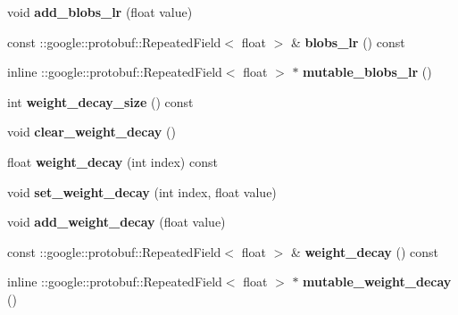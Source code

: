 \begin{DoxyCompactItemize}
void {\bfseries add\+\_\+blobs\+\_\+lr} (float value)
\item 
\mbox{\label{classcaffe_1_1_v0_layer_parameter_aad501869228a0d880f0899ce08270705}} 
const \+::google\+::protobuf\+::\+Repeated\+Field$<$ float $>$ \& {\bfseries blobs\+\_\+lr} () const
\item 
\mbox{\label{classcaffe_1_1_v0_layer_parameter_a98ee3955e1bbed8b7dfc98e8252832ce}} 
inline \+::google\+::protobuf\+::\+Repeated\+Field$<$ float $>$ $\ast$ {\bfseries mutable\+\_\+blobs\+\_\+lr} ()
\item 
\mbox{\label{classcaffe_1_1_v0_layer_parameter_a07bfc3bc513810fa6741308fa62bffad}} 
int {\bfseries weight\+\_\+decay\+\_\+size} () const
\item 
\mbox{\label{classcaffe_1_1_v0_layer_parameter_a2a57929236bf1d130a89d3bb711bea0d}} 
void {\bfseries clear\+\_\+weight\+\_\+decay} ()
\item 
\mbox{\label{classcaffe_1_1_v0_layer_parameter_ace05abd10a0c13883e8373a8e99a2202}} 
float {\bfseries weight\+\_\+decay} (int index) const
\item 
\mbox{\label{classcaffe_1_1_v0_layer_parameter_a85c6bbbb973441dc5f0d34c8c394651c}} 
void {\bfseries set\+\_\+weight\+\_\+decay} (int index, float value)
\item 
\mbox{\label{classcaffe_1_1_v0_layer_parameter_aaec46c641f69421ba64830912aeb2f1f}} 
void {\bfseries add\+\_\+weight\+\_\+decay} (float value)
\item 
\mbox{\label{classcaffe_1_1_v0_layer_parameter_a8c501949a8f645d436a8e001b48d5699}} 
const \+::google\+::protobuf\+::\+Repeated\+Field$<$ float $>$ \& {\bfseries weight\+\_\+decay} () const
\item 
\mbox{\label{classcaffe_1_1_v0_layer_parameter_a2f822fd0185b5763d5411da19e298276}} 
inline \+::google\+::protobuf\+::\+Repeated\+Field$<$ float $>$ $\ast$ {\bfseries mutable\+\_\+weight\+\_\+decay} ()

\end{DoxyCompactItemize}
